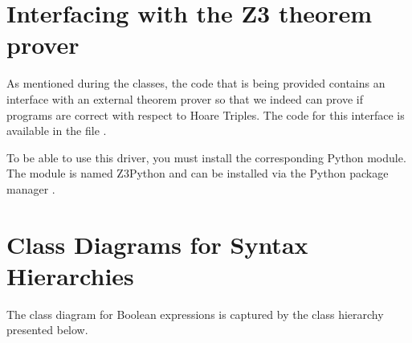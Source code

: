 \documentclass[11pt]{article}
\begin{document}
\section*{Interfacing with the Z3 theorem prover}  

As mentioned during the classes, the code that is being provided contains an interface with an external theorem prover so that we indeed can prove if programs are correct with respect to Hoare Triples. The code for this interface is available in the file .

To be able to use this driver, you must install the corresponding Python module. The module is named Z3Python and can be installed via the Python package manager .





\section*{Class Diagrams for Syntax Hierarchies}

The class diagram for Boolean expressions is captured by the class hierarchy presented below.
\end{document}
